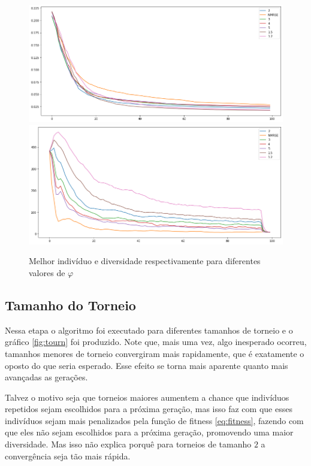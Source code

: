 \documentclass[10pt,twocolumn,letterpaper]{article}
\begin{document}
\begin{figure}[h]
   \begin{center}
   \includegraphics[width=\linewidth]{phi_best.png}
   \includegraphics[width=\linewidth]{phi_div.png}
   \end{center}
      \caption{Melhor indivíduo e diversidade respectivamente para diferentes valores de $\varphi$}
      \label{fig:phi}
\end{figure}



\subsection{Tamanho do Torneio}

Nessa etapa o algoritmo foi executado para diferentes tamanhos de torneio e o gráfico \ref{fig:tourn} foi produzido. Note que, mais uma vez, algo inesperado ocorreu, tamanhos menores de torneio convergiram mais rapidamente, que é exatamente o oposto do que seria esperado. Esse efeito se torna mais aparente quanto mais avançadas as gerações.

Talvez o motivo seja que torneios maiores aumentem a chance que indivíduos repetidos sejam escolhidos para a próxima geração, mas isso faz com que esses indivíduos sejam mais penalizados pela função de fitness \ref{eq:fitness}, fazendo com que eles não sejam escolhidos para a próxima geração, promovendo uma maior diversidade. Mas isso não explica porquê para torneios de tamanho $2$ a convergência seja tão mais rápida.
\end{document}
